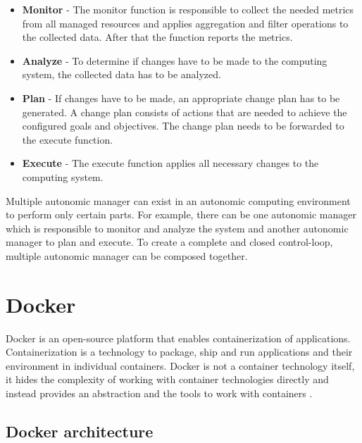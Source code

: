 \begin{itemize}
\item \textbf{Monitor}
- The monitor function is responsible to collect the needed metrics from all managed resources and applies aggregation and filter
operations to the collected data. After that the function reports the metrics.

\item \textbf{Analyze}
- To determine if changes have to be made to the computing system, the collected data has to be analyzed.

\item \textbf{Plan}
- If changes have to be made, an appropriate change plan has to be generated. A change plan consists of actions that are needed to achieve the configured goals and objectives. The change plan needs to be forwarded to the execute function.

\item \textbf{Execute}
- The execute function applies all necessary changes to the computing system.

\end{itemize}

Multiple autonomic manager can exist in an autonomic computing environment to perform only certain parts. For example, 
there can be one autonomic manager which is responsible to monitor and analyze the system and another autonomic manager 
to plan and execute. To create a complete and closed control-loop, multiple autonomic manager can be composed together.


\section{Docker}
Docker is an open-source platform that enables containerization of applications. Containerization is a technology to package, ship and run applications and their environment in individual containers.
Docker is not a container technology itself, it hides the complexity of working with container technologies directly and instead provides an abstraction and the tools to work with containers \cite{Nickoloff2019Docker, Bullington2020Docker, Potdar2020Docker}.


\subsection{Docker architecture}

